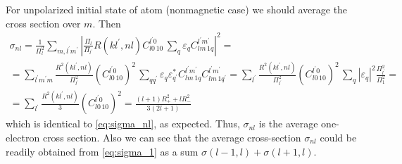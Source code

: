 \documentclass[a4paper,oneside,12pt]{extarticle}
\begin{document}
For unpolarized initial state of atom (nonmagnetic case) we should average the cross section over $m$. Then
\begin{multline}
\sigma_{nl} =
\frac{1}{\Pi^2_l} \sum_{m,l^{\prime} m^{\prime}} \left| \frac{\Pi_l}{\Pi_{l^{\prime}}} R(kl^{\prime},nl) 
C_{l 0 \, 1 0}^{l^{\prime} 0}  \,
\sum_{q }  \varepsilon_q C_{l m \, 1 q}^{l^{\prime} m^{\prime}} \right|^2 = \\ =
\sum_{l^{\prime} m^{\prime} m} \frac{R^2(kl^{\prime},nl)}{\Pi^2_{l^{\prime}}}  
(C_{l 0 \, 1 0}^{l^{\prime} 0})^2  \,
\sum_{q q^{\prime}}  \varepsilon_q \varepsilon^*_{q^{\prime}} C_{l m \, 1 q}^{l^{\prime} m^{\prime}} C_{l m \, 1 q^{\prime}}^{l^{\prime} m^{\prime}} =
\sum_{l^{\prime} } \frac{R^2(kl^{\prime},nl)}{\Pi^2_{l^{\prime}}}  
(C_{l 0 \, 1 0}^{l^{\prime} 0})^2  \,
\sum_{q}  |\varepsilon_q|^2 \frac{\Pi^2_{l^{\prime}}}{\Pi^2_1} = \\ =
\sum_{l^{\prime} } \frac{R^2(kl^{\prime},nl)}{3}  
(C_{l 0 \, 1 0}^{l^{\prime} 0})^2 = 
\frac{(l+1)R^2_+ + l R^2_-}{3(2l+1)}
\end{multline}
which is identical to \ref{eq:sigma_nl}, as expected. Thus, $\sigma_{nl}$ is the average one-electron cross section. Also we can see that the average cross-section $\sigma_{nl}$ could be readily obtained from \ref{eq:sigma_1} as a sum $\sigma(l-1,l)+\sigma(l+1,l)$. 
%
\end{document}
